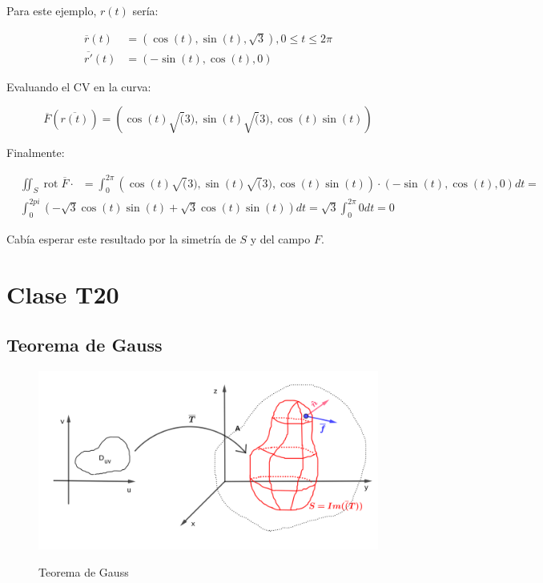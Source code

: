\documentclass{article}
\begin{document}
\begin{enumerate}
Para este ejemplo, $r(t)$ sería:

\begin{align}
\overline{r}(t) &= \left( \cos (t), \sin (t), \sqrt{3} \right), 0 \leq t \leq 2\pi \\
\overline{r'}(t) &= \left( -\sin (t), \cos (t), 0 \right)
\end{align}

Evaluando el CV en la curva:

\begin{equation}
\overline{F}(\overline{r(t)}) = \left( \cos(t) \sqrt(3), \sin(t) \sqrt(3), \cos(t) \sin(t) \right)
\end{equation}

Finalmente:

\begin{align}
& \iint_S \mathop{rot}\overline{F} \cdot \mathop{\overline{dS}} = \int_0^{2\pi} \left( \cos(t) \sqrt(3), \sin(t) \sqrt(3), \cos(t) \sin(t) \right) \cdot \left( -\sin (t), \cos (t), 0 \right) dt = \\
& \int_0^{2pi} \left( -\sqrt{3} \cos(t) \sin(t) + \sqrt{3} \cos(t) \sin(t) \right) dt = \sqrt{3} \int_0^{2\pi} 0 dt = 0
\end{align}

Cabía esperar este resultado por la simetría de $S$ y del campo $F$.

\end{enumerate}

\section{Clase T20}

\subsection{Teorema de Gauss}

\begin{figure}[ht]
\centering
\caption{Teorema de Gauss}
\includegraphics[scale=0.7]{img/teo_fig037_gauss.png}
\label{fig:gauss}
\end{figure}
\end{document}
